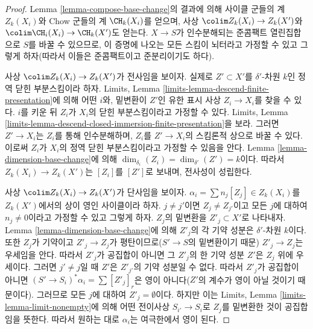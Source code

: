 \begin{proof}
Lemma \ref{lemma-compose-base-change}의 결과에 의해 사이클 군들의
계 $Z_k(X_i)$와 Chow 군들의 계 $\CH_k(X_i)$를 얻으며, 사상
$\colim Z_k(X_i) \to Z_k(X')$와
$\colim \CH_i(X_i) \to \CH_k(X')$도 얻는다. $X \to S$가
인수분해되는 준콤팩트 열린집합으로 $S$를 바꿀 수 있으므로, 이 증명에
나오는 모든 스킴이 뇌터라고 가정할 수 있고 그렇게 하자(따라서 이들은
준콤팩트이고 준분리이기도 하다).

\medskip\noindent
사상 $\colim Z_k(X_i) \to Z_k(X')$가 전사임을 보이자. 실제로
$Z' \subset X'$를 $\delta'$-차원 $k$인 정역 닫힌 부분스킴이라 하자.
Limits, Lemma \ref{limits-lemma-descend-finite-presentation}에 의해
어떤 $i$와, 밑변환이 $Z'$인 유한 표시 사상 $Z_i \to X_i$를 찾을 수
있다. $i$를 키운 뒤 $Z_i$가 $X_i$의 닫힌 부분스킴이라고 가정할 수
있다. Limits, Lemma
\ref{limits-lemma-descend-closed-immersion-finite-presentation}을 보라.
그러면 $Z' \to X_i$는 $Z_i$를 통해 인수분해하며, $Z_i$를
$Z' \to X_i$의 스킴론적 상으로 바꿀 수 있다. 이로써 $Z_i$가
$X_i$의 정역 닫힌 부분스킴이라고 가정할 수 있음을 안다. Lemma
\ref{lemma-dimension-base-change}에 의해
$\dim_{\delta_i}(Z_i) = \dim_{\delta'}(Z') = k$이다. 따라서
$Z_k(X_i) \to Z_k(X')$는 $[Z_i]$를 $[Z']$로 보내며, 전사성이
성립한다.

\medskip\noindent
사상 $\colim Z_k(X_i) \to Z_k(X')$가 단사임을 보이자.
$\alpha_i = \sum n_j[Z_j] \in Z_k(X_i)$를 $Z_k(X')$에서의 상이
영인 사이클이라 하자. $j \not = j'$이면 $Z_j \not = Z_{j'}$이고
모든 $j$에 대하여 $n_j \not = 0$이라고 가정할 수 있고 그렇게 하자.
$Z_j$의 밑변환을 $Z'_j \subset X'$로 나타내자. Lemma
\ref{lemma-dimension-base-change}에 의해 $Z'_j$의 각 기약 성분은
$\delta'$-차원 $k$이다. 또한 $Z_j$가 기약이고 $Z'_j \to Z_j$가
평탄이므로($S' \to S$의 밑변환이기 때문) $Z'_j \to Z_j$는
우세임을 안다. 따라서 $Z'_j$가 공집합이 아니면 그 $Z'_j$의 한 기약 성분
$Z'$은 $Z_j$ 위에 우세이다. 그러면 $j' \not = j$일 때 $Z'$은
$Z'_{j'}$의 기약 성분일 수 없다. 따라서 $Z'_j$가 공집합이 아니면
$(S' \to S_i)^*\alpha_i
= \sum [Z'_j]_r$은 영이 아니다($Z'$의 계수가 영이 아닐 것이기
때문이다). 그러므로 모든 $j$에 대하여 $Z'_j = \emptyset$이다.
하지만 이는 Limits, Lemma \ref{limits-lemma-limit-nonempty}에 의해
어떤 전이사상 $S_{i'} \to S_i$로 $Z_j$를 밑변환한 것이 공집합임을
뜻한다. 따라서 원하는 대로 $\alpha_i$는 여극한에서 영이 된다.


\end{proof}
